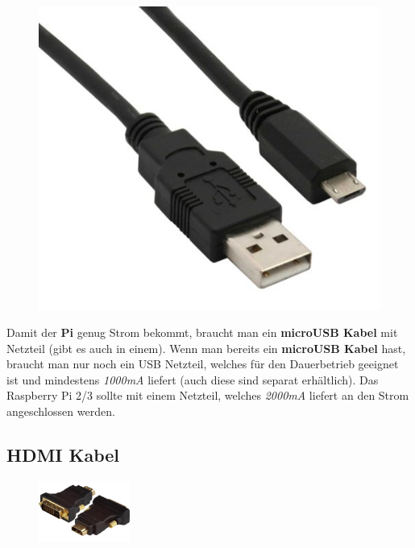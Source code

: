 \documentclass[12pt,a4paper]{article}
\begin{document}
\begin{figure}
  \vspace{-12pt}
  \begin{center}
    \includegraphics[scale=0.2]{microusb}
  \end{center}
  \vspace{-25pt}
\end{figure}

Damit der \textbf{Pi} genug Strom bekommt, braucht man ein \textbf{microUSB Kabel} mit Netzteil (gibt es auch in einem). Wenn man bereits ein \textbf{microUSB Kabel} hast, braucht man nur noch ein USB Netzteil, welches für den Dauerbetrieb geeignet ist und mindestens \textit{1000mA} liefert (auch diese sind separat erhältlich). Das Raspberry Pi 2/3 sollte mit einem Netzteil, welches \textit{2000mA} liefert an den Strom angeschlossen werden.

\subsection{HDMI Kabel}

\begin{figure}
  \vspace{-30pt}
  \begin{center}
    \includegraphics[width=3cm]{hdmi}
  \end{center}
  \vspace{-25pt}
\end{figure}
\end{document}

